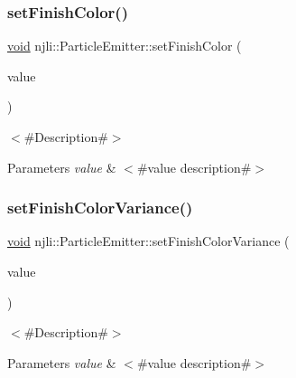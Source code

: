 \subsubsection{\texorpdfstring{set\+Finish\+Color()}{setFinishColor()}}
{\footnotesize\ttfamily \mbox{\hyperlink{_thread_8h_af1e856da2e658414cb2456cb6f7ebc66}{void}} njli\+::\+Particle\+Emitter\+::set\+Finish\+Color (\begin{DoxyParamCaption}\item[{const bt\+Vector4 \&}]{value }\end{DoxyParamCaption})}

$<$\#\+Description\#$>$


\begin{DoxyParams}{Parameters}
{\em value} & $<$\#value description\#$>$ \\
\hline
\end{DoxyParams}
\mbox{\label{classnjli_1_1_particle_emitter_a85cd1f4e3a66a351a1fd0918667cedf7}} 
\subsubsection{\texorpdfstring{set\+Finish\+Color\+Variance()}{setFinishColorVariance()}}
{\footnotesize\ttfamily \mbox{\hyperlink{_thread_8h_af1e856da2e658414cb2456cb6f7ebc66}{void}} njli\+::\+Particle\+Emitter\+::set\+Finish\+Color\+Variance (\begin{DoxyParamCaption}\item[{const bt\+Vector4 \&}]{value }\end{DoxyParamCaption})}

$<$\#\+Description\#$>$


\begin{DoxyParams}{Parameters}
{\em value} & $<$\#value description\#$>$ \\
\hline
\end{DoxyParams}
\mbox{\label{classnjli_1_1_particle_emitter_abc00f8ad722fcb0e694db302e6942ec6}} 
